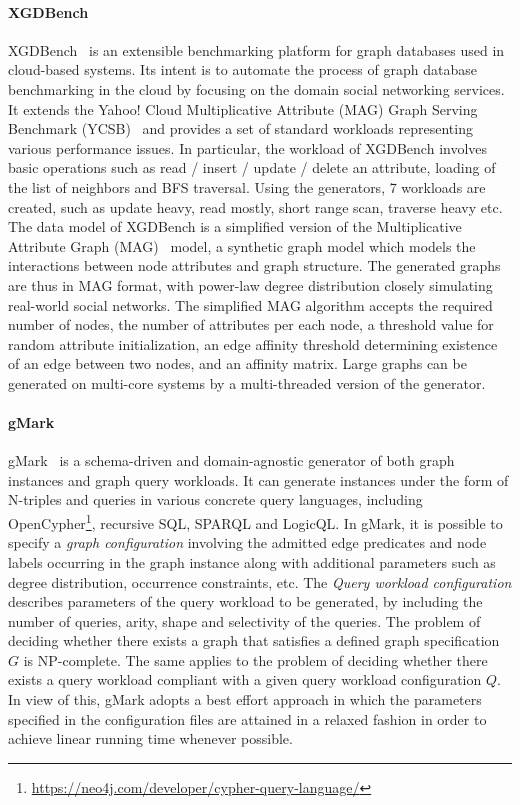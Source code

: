 \paragraph{XGDBench} XGDBench~\cite{Dayarathna:2014:GDB:2676904.2676939} is an extensible  benchmarking platform for graph databases used in cloud-based systems. Its intent is to automate
the process of graph database benchmarking in the cloud by focusing on the domain social networking services. It extends the Yahoo! Cloud Multiplicative Attribute (MAG) Graph Serving Benchmark (YCSB)~\cite{Cooper:2010:BCS:1807128.1807152} and provides a set of standard workloads representing various performance issues. In particular, the workload of XGDBench involves basic operations such as read / insert / update / delete an attribute, loading of the list of neighbors and BFS traversal. Using the generators, 7 workloads are created, such as update heavy, read mostly, short range scan, traverse heavy etc.
The data model of XGDBench is a simplified version of the Multiplicative Attribute Graph (MAG)~\cite{Kim2010} model, a synthetic graph model which models the interactions between  node attributes and  graph structure.
The generated graphs are thus in MAG format, with power-law degree distribution closely simulating real-world social networks.
The simplified MAG algorithm accepts the required number of nodes, the number of attributes per each node, a threshold value for random attribute initialization, an edge affinity threshold determining existence of an edge between two nodes, and an affinity matrix. \iffalse It has been proven that MAG generates graphs with both analytically tractable and statistically interesting properties.\fi 
Large graphs can be generated on multi-core systems by a multi-threaded version of the  generator.


\paragraph{gMark}  gMark~\cite{gMark} is a schema-driven and domain-agnostic generator of both graph instances and graph query workloads. It can generate instances under the form of N-triples and queries in various concrete query languages, including OpenCypher\footnote{\url{https://neo4j.com/developer/cypher-query-language/}}, recursive SQL, SPARQL and LogicQL. In gMark, it is possible to specify a \emph{graph configuration} involving the admitted edge predicates and node labels occurring in the graph instance along with additional parameters such as degree distribution, occurrence constraints, etc. The \emph{Query workload configuration} describes parameters of the query workload to be generated, by including the number of queries, arity, shape and selectivity of the queries.
The problem of deciding whether there exists a graph that satisfies a defined graph specification $G$ is NP-complete. The same applies to the problem of deciding
whether there exists a query workload compliant with a given query workload configuration $Q$. In view of this, gMark adopts a best effort approach in which the
parameters specified in the configuration files are attained in a relaxed fashion in order to achieve linear running time whenever possible.

